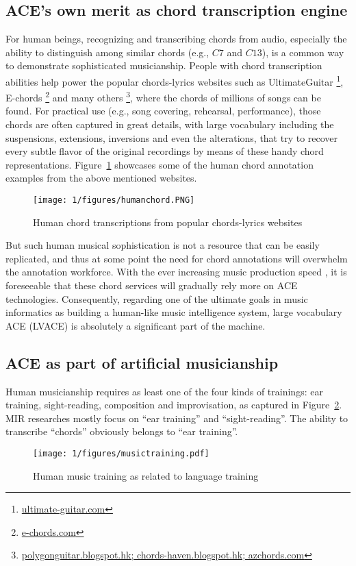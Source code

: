 \subsection{ACE's own merit as chord transcription engine}
For human beings, recognizing and transcribing chords from audio, especially the ability to distinguish among similar chords (e.g., $C7$ and $C13$), is a common way to demonstrate sophisticated musicianship. People with chord transcription abilities help power the popular chords-lyrics websites such as UltimateGuitar \footnote{\url{ultimate-guitar.com}}, E-chords \footnote{\url{e-chords.com}} and many others \footnote{\url{polygonguitar.blogspot.hk; chords-haven.blogspot.hk; azchords.com}}, where the chords of millions of songs can be found. For practical use (e.g., song covering, rehearsal, performance), those chords are often captured in great details, with large vocabulary including the suspensions, extensions, inversions and even the alterations, that try to recover every subtle flavor of the original recordings by means of these handy chord representations. Figure~\ref{fig:1-humanchord} showcases some of the human chord annotation examples from the above mentioned websites.
\begin{figure}
\centering
\texttt{[image: 1/figures/humanchord.PNG]}
\caption{Human chord transcriptions from popular chords-lyrics websites}
\label{fig:1-humanchord}
\end{figure}

But such human musical sophistication is not a resource that can be easily replicated, and thus at some point the need for chord annotations will overwhelm the annotation workforce. With the ever increasing music production speed \cite{globalmusicreport}, it is foreseeable that these chord services will gradually rely more on ACE technologies. Consequently, regarding one of the ultimate goals in music informatics as building a human-like music intelligence system, large vocabulary ACE (LVACE) is absolutely a significant part of the machine.

\subsection{ACE as part of artificial musicianship}
Human musicianship requires as least one of the four kinds of trainings: ear training, sight-reading, composition and improvisation, as captured in Figure~\ref{fig:1-musictraining}. MIR researches mostly focus on ``ear training'' and ``sight-reading''. The ability to transcribe ``chords'' obviously belongs to ``ear training''.
\begin{figure}
\centering
\texttt{[image: 1/figures/musictraining.pdf]}
\caption{Human music training as related to language training}
\label{fig:1-musictraining}
\end{figure}

